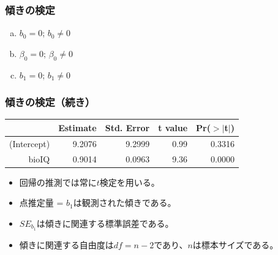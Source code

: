 
\begin{frame}
\frametitle{傾きの検定}


\begin{enumerate}[(a)]
\item {} $b_0 = 0$;  $b_0 \ne 0$
\item {} $\beta_0 = 0$;  $\beta_0 \ne 0$
\item {} $b_1 = 0$;  $b_1 \ne 0$
\end{enumerate}

\end{frame}


\begin{frame}
\frametitle{傾きの検定（続き）}

{\footnotesize
\begin{center}
\begin{tabular}{rrrrr}
  \hline
 & Estimate & Std. Error & t value & Pr($>$$|$t$|$) \\
  \hline
(Intercept) & 9.2076 & 9.2999 & 0.99 & 0.3316 \\
  bioIQ & 0.9014 & 0.0963 & 9.36 & 0.0000 \\
   \hline
\end{tabular}
\end{center}
}

\begin{itemize}

\item 回帰の推測では常に$t$検定を用いる。$\:$ \\


\item 点推定量 = $b_1$は観測された傾きである。

\item $SE_{b_1}$は傾きに関連する標準誤差である。

\item 傾きに関連する自由度は$df = n - 2$であり、$n$は標本サイズである。$\:$ \\

\end{itemize}

\end{frame}


